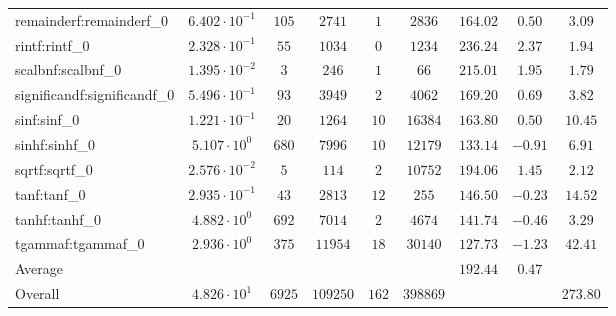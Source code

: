 \begin{tabular}{|l|c|c|c|c|c|c|c|c|}
remainderf:remainderf\_0     & $ 6.402 \cdot 10^{-1} $ & $ 105    $ & $ 2741   $ & $ 1   $ & $ 2836   $ & $ 164.02      $ & $ 0.50    $ & $ 3.09    $ \\
rintf:rintf\_0               & $ 2.328 \cdot 10^{-1} $ & $ 55     $ & $ 1034   $ & $ 0   $ & $ 1234   $ & $ 236.24      $ & $ 2.37    $ & $ 1.94    $ \\
scalbnf:scalbnf\_0           & $ 1.395 \cdot 10^{-2} $ & $ 3      $ & $ 246    $ & $ 1   $ & $ 66     $ & $ 215.01      $ & $ 1.95    $ & $ 1.79    $ \\
significandf:significandf\_0 & $ 5.496 \cdot 10^{-1} $ & $ 93     $ & $ 3949   $ & $ 2   $ & $ 4062   $ & $ 169.20      $ & $ 0.69    $ & $ 3.82    $ \\
sinf:sinf\_0                 & $ 1.221 \cdot 10^{-1} $ & $ 20     $ & $ 1264   $ & $ 10  $ & $ 16384  $ & $ 163.80      $ & $ 0.50    $ & $ 10.45   $ \\
sinhf:sinhf\_0               & $ 5.107 \cdot 10^{0}  $ & $ 680    $ & $ 7996   $ & $ 10  $ & $ 12179  $ & $ 133.14      $ & $ -0.91   $ & $ 6.91    $ \\
sqrtf:sqrtf\_0               & $ 2.576 \cdot 10^{-2} $ & $ 5      $ & $ 114    $ & $ 2   $ & $ 10752  $ & $ 194.06      $ & $ 1.45    $ & $ 2.12    $ \\
tanf:tanf\_0                 & $ 2.935 \cdot 10^{-1} $ & $ 43     $ & $ 2813   $ & $ 12  $ & $ 255    $ & $ 146.50      $ & $ -0.23   $ & $ 14.52   $ \\
tanhf:tanhf\_0               & $ 4.882 \cdot 10^{0}  $ & $ 692    $ & $ 7014   $ & $ 2   $ & $ 4674   $ & $ 141.74      $ & $ -0.46   $ & $ 3.29    $ \\
tgammaf:tgammaf\_0           & $ 2.936 \cdot 10^{0}  $ & $ 375    $ & $ 11954  $ & $ 18  $ & $ 30140  $ & $ 127.73      $ & $ -1.23   $ & $ 42.41   $ \\
\hline
Average                      & $                     $ & $        $ & $        $ & $     $ & $        $ & $ 192.44      $ & $ 0.47    $ & $         $ \\
\hline
Overall                      & $ 4.826 \cdot 10^{1}  $ & $ 6925   $ & $ 109250 $ & $ 162 $ & $ 398869 $ & $             $ & $         $ & $ 273.80  $ \\
\hline
\end{tabular}

